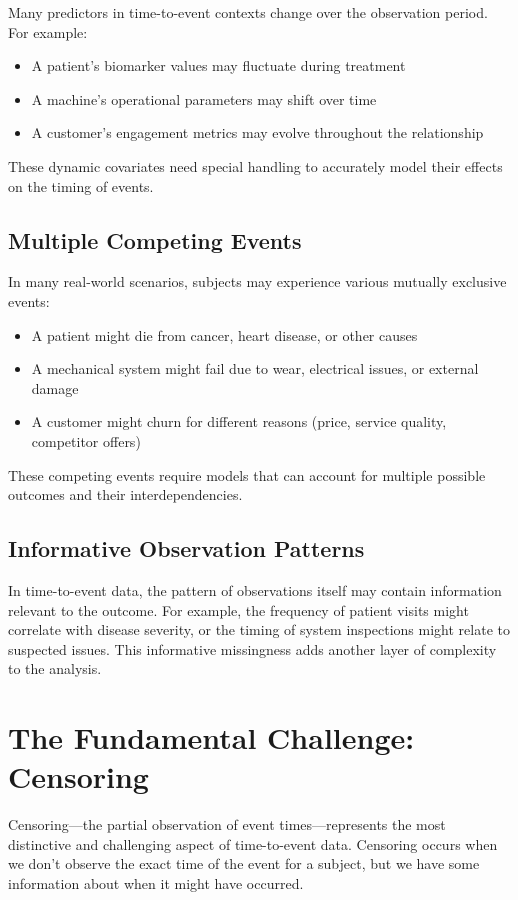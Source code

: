 Many predictors in time-to-event contexts change over the observation period. For example:
\begin{itemize}
\item A patient's biomarker values may fluctuate during treatment
\item A machine's operational parameters may shift over time
\item A customer's engagement metrics may evolve throughout the relationship
\end{itemize}

These dynamic covariates need special handling to accurately model their effects on the timing of events.

\subsection{Multiple Competing Events}

In many real-world scenarios, subjects may experience various mutually exclusive events:
\begin{itemize}
\item A patient might die from cancer, heart disease, or other causes
\item A mechanical system might fail due to wear, electrical issues, or external damage
\item A customer might churn for different reasons (price, service quality, competitor offers)
\end{itemize}

These competing events require models that can account for multiple possible outcomes and their interdependencies.

\subsection{Informative Observation Patterns}

In time-to-event data, the pattern of observations itself may contain information relevant to the outcome. For example, the frequency of patient visits might correlate with disease severity, or the timing of system inspections might relate to suspected issues. This informative missingness adds another layer of complexity to the analysis.

\section{The Fundamental Challenge: Censoring}

Censoring—the partial observation of event times—represents the most distinctive and challenging aspect of time-to-event data. Censoring occurs when we don't observe the exact time of the event for a subject, but we have some information about when it might have occurred.

